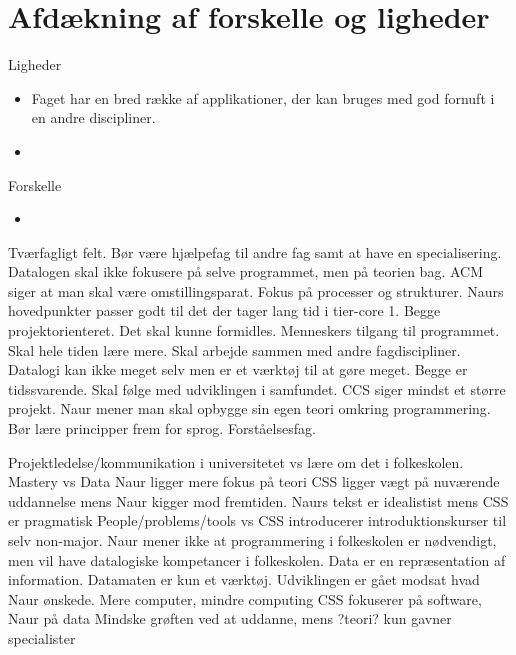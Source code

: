 \section{Afdækning af forskelle og ligheder}

Ligheder
\begin{itemize}
\item Faget har en bred række af applikationer, der kan bruges med god fornuft i en andre discipliner.
\item 
\end{itemize}

Forskelle
\begin{itemize}
\item 
\end{itemize}

Tværfagligt felt. Bør være hjælpefag til andre fag samt at have en specialisering.
Datalogen skal ikke fokusere på selve programmet, men på teorien bag. ACM siger at man skal være omstillingsparat.
Fokus på processer og strukturer. Naurs hovedpunkter passer godt til det der tager lang tid i tier-core 1.
Begge projektorienteret.
Det skal kunne formidles.
Menneskers tilgang til programmet.
Skal hele tiden lære mere.
Skal arbejde sammen med andre fagdiscipliner.
Datalogi kan ikke meget selv men er et værktøj til at gøre meget.
Begge er tidssvarende.
Skal følge med udviklingen i samfundet.
CCS siger mindst et større projekt.
Naur mener man skal opbygge sin egen teori omkring programmering.
Bør lære principper frem for sprog. Forståelsesfag.


Projektledelse/kommunikation i universitetet vs lære om det i folkeskolen.
Mastery vs Data
Naur ligger mere fokus på teori
CSS ligger vægt på nuværende uddannelse mens Naur kigger mod fremtiden.
Naurs tekst er idealistist mens CSS er pragmatisk
People/problems/tools vs 
CSS introducerer introduktionskurser til selv non-major. Naur mener ikke at programmering i folkeskolen er nødvendigt, men vil have datalogiske kompetancer i folkeskolen.
Data er en repræsentation af information. Datamaten er kun et værktøj.
Udviklingen er gået modsat hvad Naur ønskede. Mere computer, mindre computing
CSS fokuserer på software, Naur på data
Mindske grøften ved at uddanne, mens ?teori? kun gavner specialister

